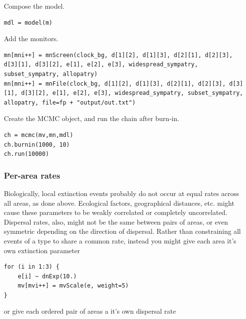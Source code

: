 Compose the model.

\begin{snugshade}
\begin{lstlisting}
mdl = model(m)
\end{lstlisting}
\end{snugshade}

Add the monitors.

\begin{snugshade}
\begin{lstlisting}
mn[mni++] = mnScreen(clock_bg, d[1][2], d[1][3], d[2][1], d[2][3], d[3][1], d[3][2], e[1], e[2], e[3], widespread_sympatry, subset_sympatry, allopatry)
mn[mni++] = mnFile(clock_bg, d[1][2], d[1][3], d[2][1], d[2][3], d[3][1], d[3][2], e[1], e[2], e[3], widespread_sympatry, subset_sympatry, allopatry, file=fp + "output/out.txt")
\end{lstlisting}
\end{snugshade}

Create the MCMC object, and run the chain after burn-in.
\begin{snugshade}
\begin{lstlisting}
ch = mcmc(mv,mn,mdl)
ch.burnin(1000, 10)
ch.run(10000)
\end{lstlisting}
\end{snugshade}

\subsubsection{Per-area rates}

Biologically, local extinction events probably do not occur at equal rates across all areas, as done above.
Ecological factors, geographical distances, etc. might cause these parameters to be weakly correlated or completely uncorrelated.
Dispersal rates, also, might not be the same between pairs of areas, or even symmetric depending on the direction of dispersal.
Rather than constraining all events of a type to share a common rate, instead you might give each area it's own extinction parameter

\begin{snugshade}
\begin{lstlisting}
for (i in 1:3) {
    e[i] ~ dnExp(10.)
    mv[mvi++] = mvScale(e, weight=5)
}
\end{lstlisting}
\end{snugshade}

or give each ordered pair of areas a it's own dispersal rate

